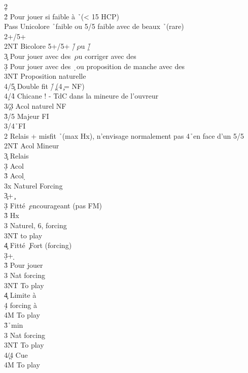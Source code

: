 \documentclass[a4paper]{article}
\begin{document}
\begin{bidtable}
2\d\+\\
2\h \> Pour jouer si faible à \h\ (< 15 HCP)\+\\
Pass \> Unicolore \h\ faible ou 5/5 faible avec de beaux \h\ (rare)\\
2\s {}+\s /5+\h \\
2NT \> Bicolore 5+/5+ \h /\c\ ou \h /\d \+\\
3\c \> Pour jouer avec des \c\ ou corriger avec des \d \\
3\d \> Pour jouer avec des \d\ ou proposition de manche avec des \c \\
3NT \> Proposition naturelle\\
4/5\c \> Double fit \h /\c\ (4\c\ = NF)\\
4\d/4\h \> Chicane ! - TdC dans la mineure de l'ouvreur\-\\
3\c/3\d \> Acol naturel NF\\
3\h {}/5 Majeur FI\\
3\s {}\s /4\h\ FI\-\\
2\s \> Relais + misfit \h\ (max Hx), n'envisage normalement pas 4\h\ en face d'un 5/5\+\\
2NT \> Acol Mineur\+\\
3\c \> Relais\+\\
3\d \> Acol \c \\
3\h \> Acol \d \-\\
3x \> Naturel Forcing\-\\
3\c {}+ \c \+\\
3\d \> Fitté \c\ encourageant (pas FM)\\
3\h \> Hx\\
3\s \> Naturel, 6\s , forcing\\
3NT \> to play\\
4\c \> Fitté \c\ Fort (forcing)\-\\
3\d {}+ \d \+\\
3\h \> Pour jouer\\
3\s \> Nat forcing\\
3NT \> To play\\
4\c \> Limite à \d \\
4\d \> forcing à \d \\
4M \> To play\-\\
3\h {}\h\ min\+\\
3\s \> Nat forcing\\
3NT \> To play\\
4\c/4\d \> Cue \h \\
4M \> To play\-\\

\end{bidtable}
\end{document}
